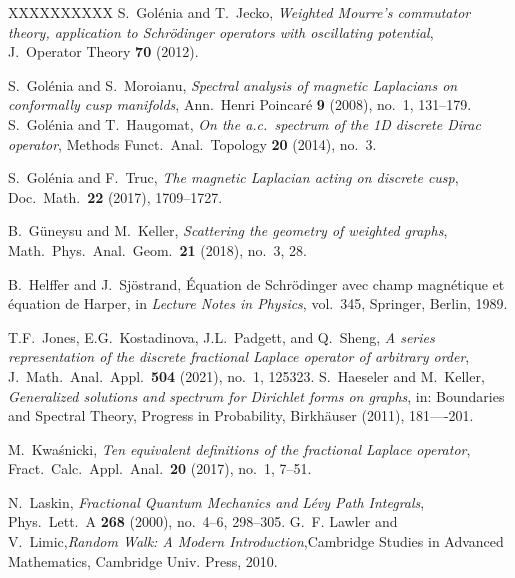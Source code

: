 \documentclass[10pt]{amsart}
\newcommand{\1}{{\mathbb{I}}}
\numberwithin{equation}{section}
\begin{document}
\begin{thebibliography}{XXXXXXXXXX}
 S.\ Gol\'enia and T.\ Jecko, \emph{Weighted Mourre's commutator theory, application to Schr\"odinger operators with oscillating potential}, J.\ Operator Theory {\bf 70} (2012).


 S.\ Gol\'enia and S.\ Moroianu, \emph{Spectral analysis of magnetic Laplacians on conformally cusp manifolds}, Ann.\ Henri Poincar\'e {\bf 9} (2008), no.\ 1, 131--179.
 S.\ Gol\'enia and T.\ Haugomat, \emph{On the a.c.\ spectrum of the 1D discrete Dirac operator}, Methods Funct.\ Anal.\ Topology {\bf 20} (2014), no.\ 3.

 S.\ Gol\'enia and F.\ Truc, \emph{The magnetic Laplacian acting on discrete cusp}, Doc.\ Math.\ {\bf 22} (2017), 1709--1727.

 B.\ G{\"u}neysu and M.\ Keller, \emph{Scattering the geometry of weighted graphs}, Math.\ Phys.\ Anal.\ Geom.\ {\bf 21} (2018), no.\ 3, 28.


B.~Helffer and J.~Sjöstrand,
Équation de Schrödinger avec champ magnétique et équation de Harper,
in \emph{Lecture Notes in Physics}, vol.~345, Springer, Berlin, 1989.


 T.F.\ Jones, E.G.\ Kostadinova, J.L.\ Padgett, and Q.\ Sheng, \emph{A series representation of the discrete fractional Laplace operator of arbitrary order}, J.\ Math.\ Anal.\ Appl.\ {\bf 504} (2021), no.\ 1, 125323.
     S.\ Haeseler and M.\ Keller, \emph{Generalized solutions and spectrum for Dirichlet forms on graphs}, in: Boundaries and Spectral Theory, Progress in Probability, Birkh\"auser (2011), 181----201.


 M.\ Kwa\'{s}nicki, \emph{Ten equivalent definitions of the fractional Laplace operator}, Fract.\ Calc.\ Appl.\ Anal.\ {\bf 20} (2017), no.\ 1, 7--51.


 N.\ Laskin, \emph{Fractional Quantum Mechanics and L\'evy Path Integrals}, Phys.\ Lett.\ A {\bf 268} (2000), no.\ 4--6, 298--305.
G.~F. Lawler and V.~Limic,\emph{Random Walk: A Modern Introduction},Cambridge Studies in Advanced Mathematics, Cambridge Univ. Press, 2010.




\end{thebibliography}
\end{document}
